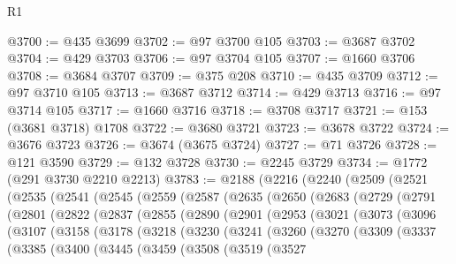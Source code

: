 \begin{lexlean}{R1}
\begin{coremodule}
{{{{{{{{{{{{{{{{{{{{{{{{{{{{{{{{{{{{{{{{{{{{{{{{{{{{{{{{{{{{{{{{{{{{{{{{{{{{{{{{{{{{{{{{{{{{{{{{{{{{{{{{{{{{{{{{{{{{{{{{{{{{{{{{{{{{{{{{{{{{{{{{{{{{{{{{{{{{{{{{{{{{{{{{{{{{{{{{{{{{{{{{{{@3700 := @435 @3699
@3702 := @97 @3700 @105
@3703 := @3687 @3702
@3704 := @429 @3703
@3706 := @97 @3704 @105
@3707 := @1660 @3706
@3708 := @3684 @3707
@3709 := @375 @208
@3710 := @435 @3709
@3712 := @97 @3710 @105
@3713 := @3687 @3712
@3714 := @429 @3713
@3716 := @97 @3714 @105
@3717 := @1660 @3716
@3718 := @3708 @3717
@3721 := @153 (@3681 @3718) @1708
@3722 := @3680 @3721
@3723 := @3678 @3722
@3724 := @3676 @3723
@3726 := @3674 (@3675 @3724)
@3727 := @71 @3726
@3728 := @121 @3590
@3729 := @132 @3728
@3730 := @2245 @3729
@3734 := @1772 (@291 @3730 @2210 @2213)
@3783 := @2188
    (@2216
      (@2240
        (@2509
          (@2521
            (@2535
              (@2541
                (@2545
                  (@2559
                    (@2587
                      (@2635
                        (@2650
                          (@2683
                            (@2729
                              (@2791
                                (@2801
                                  (@2822
                                    (@2837
                                      (@2855
                                        (@2890
                                          (@2901
                                            (@2953
                                              (@3021
                                                (@3073
                                                  (@3096
                                                    (@3107
                                                      (@3158
                                                        (@3178
                                                          (@3218
                                                            (@3230
                                                              (@3241
                                                                (@3260
                                                                  (@3270
                                                                    (@3309
                                                                      (@3337
                                                                        (@3385
                                                                          (@3400
                                                                            (@3445
                                                                              (@3459
                                                                                (@3508
                                                                                  (@3519
                                                                                    (@3527
}}}}}}}}}}}}}}}}}}}}}}}}}}}}}}}}}}}}}}}}}}}}}}}}}}}}}}}}}}}}}}}}}}}}}}}}}}}}}}}}}}}}}}}}}}}}}}}}}}}}}}}}}}}}}}}}}}}}}}}}}}}}}}}}}}}}}}}}}}}}}}}}}}}}}}}}}}}}}}}}}}}}}}}}}}}}}}}}}}}}}}}}}}
\end{coremodule}
\end{lexlean}
